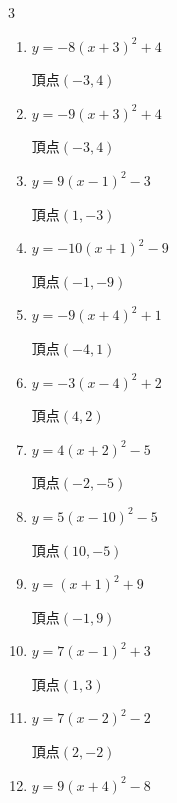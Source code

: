\begin{multicols}{3}
\begin{enumerate}
\resetques

  \item $\displaystyle y=-8\left( x+3\right)^{2}+4$

        $\displaystyle 頂点\left( -3 , 4 \right)$

  \item $\displaystyle y=-9\left( x+3\right)^{2}+4$

        $\displaystyle 頂点\left( -3 , 4 \right)$

  \item $\displaystyle y=9\left( x-1\right)^{2}-3$

        $\displaystyle 頂点\left( 1 , -3 \right)$

  \item $\displaystyle y=-10\left( x+1\right)^{2}-9$

        $\displaystyle 頂点\left( -1 , -9 \right)$

  \item $\displaystyle y=-9\left( x+4\right)^{2}+1$

        $\displaystyle 頂点\left( -4 , 1 \right)$

  \item $\displaystyle y=-3\left( x-4\right)^{2}+2$

        $\displaystyle 頂点\left( 4 , 2 \right)$

  \item $\displaystyle y=4\left( x+2\right)^{2}-5$

        $\displaystyle 頂点\left( -2 , -5 \right)$

  \item $\displaystyle y=5\left( x-10\right)^{2}-5$

        $\displaystyle 頂点\left( 10 , -5 \right)$

  \item $\displaystyle y=\left( x+1\right)^{2}+9$

        $\displaystyle 頂点\left( -1 , 9 \right)$

  \item $\displaystyle y=7\left( x-1\right)^{2}+3$

        $\displaystyle 頂点\left( 1 , 3 \right)$

  \item $\displaystyle y=7\left( x-2\right)^{2}-2$

        $\displaystyle 頂点\left( 2 , -2 \right)$

  \item $\displaystyle y=9\left( x+4\right)^{2}-8$


\end{enumerate}
\end{multicols}
